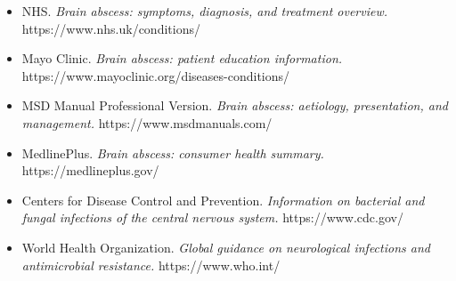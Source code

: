 \begin{itemize}
    \item NHS. \textit{Brain abscess: symptoms, diagnosis, and treatment overview.} https://www.nhs.uk/conditions/
    \item Mayo Clinic. \textit{Brain abscess: patient education information.} https://www.mayoclinic.org/diseases-conditions/
    \item MSD Manual Professional Version. \textit{Brain abscess: aetiology, presentation, and management.} https://www.msdmanuals.com/
    \item MedlinePlus. \textit{Brain abscess: consumer health summary.} https://medlineplus.gov/
    \item Centers for Disease Control and Prevention. \textit{Information on bacterial and fungal infections of the central nervous system.} https://www.cdc.gov/
    \item World Health Organization. \textit{Global guidance on neurological infections and antimicrobial resistance.} https://www.who.int/
\end{itemize}
